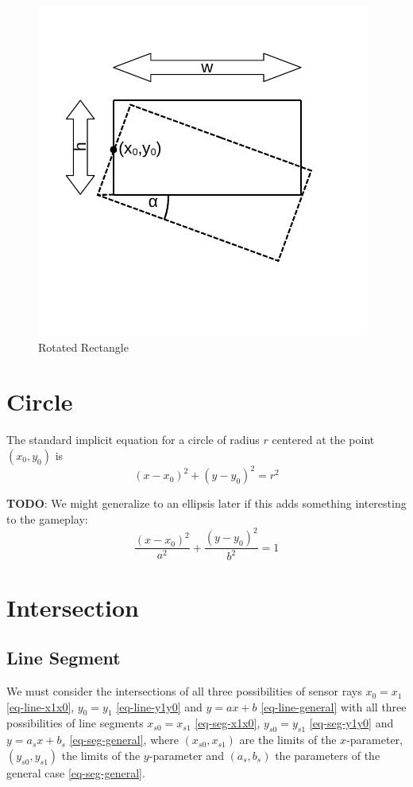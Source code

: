 \documentclass[11pt]{article}
\newcommand{\TODO}{{\bf TODO}}
\begin{document}
\begin{figure}
    \centering
    \includegraphics[trim=10 40 10 20]{rectangle.pdf}
    \caption{Rotated Rectangle}\label{fig-rectangle}
\end{figure}

\section{Circle}
\label{sec-circle}

The standard implicit equation for a circle of radius $r$  centered at the
point $(x_0, y_0)$ is
\begin{equation}
    (x - x_0)^2 + (y - y_0)^2 = r^2\label{eq-circle}
\end{equation}

\TODO: We might generalize to an ellipsis later if this adds something
interesting to the gameplay:
\begin{equation}
    \frac{(x-x_0)^2}{a^2} + \frac{(y-y_0)^2}{b^2} = 1
\end{equation}

\section{Intersection}
\label{sec-intersection}

\subsection{Line Segment}
\label{sec-intersection-line-segment}
We must consider the intersections of all three possibilities of sensor rays
$x_0=x_1$ \eqref{eq-line-x1x0}, $y_0=y_1$ \eqref{eq-line-y1y0} and $y=ax+b$
\eqref{eq-line-general} with all three possibilities of line segments
$x_{s0}=x_{s1}$ \eqref{eq-seg-x1x0}, $y_{s0}=y_{s1}$ \eqref{eq-seg-y1y0} and
$y=a_{s}x+b_{s}$ \eqref{eq-seg-general}, where $(x_{s0}, x_{s1})$ are the
limits of the $x$-parameter, $(y_{s0}, y_{s1})$ the limits of the
$y$-parameter and $(a_{s}, b_{s})$ the parameters of the general case
\eqref{eq-seg-general}.
\end{document}
